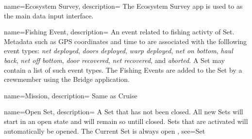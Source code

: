  {
    name=Ecosystem Survey,
    description={
        The Ecosystem Survey app is used to as the main data input interface.
    }
}




 {
    name=Fishing Event,
    description={
        An event related to fishing activty of \gls{Set}.
        Metadata such as GPS coordinates and time to are associated with the folllowing event types:
        \emph{net deployed},
        \emph{doors deployed},
        \emph{warp deployed},
        \emph{net on bottom},
        \emph{haul back},
        \emph{net off bottom},
        \emph{door recovered},
        \emph{net recovered},
        and \emph{aborted}.
        A \gls{Set} may contain a list of such event types.
        The Fishing Events are added to the \gls{Set} by a crewmember using the \gls{Bridge} application.
    }
}








 {
    name=Mission,
    description={
        Same as \gls{Cruise}
    }
}

 {
    name=Open Set,
    description={
        A \gls{Set} that has not been closed. All new Sets will start in an open state and will remain so untill closed.
        Sets that are activated will automatically be opened.
        The \gls{Current Set} is always open
    },
    see={Set}
}

